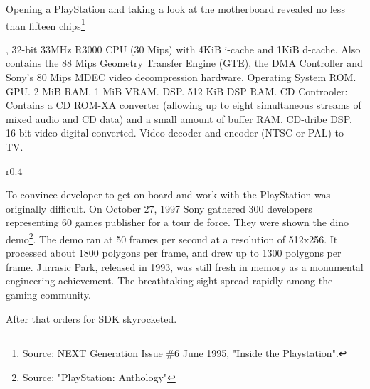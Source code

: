 \par
Opening a PlayStation and taking a look at the motherboard revealed no less than fifteen chips\footnote{Source: NEXT Generation Issue \#6 June 1995, "Inside the Playstation".}\\
\par
{}, 32-bit 33MHz R3000 CPU (30 Mips) with  4KiB i-cache and 1KiB d-cache. Also contains the 88 Mips Geometry Transfer Engine (GTE), the DMA Controller and Sony's 80 Mips MDEC video decompression hardware.
 Operating System ROM.
 GPU.
 2 MiB RAM.
 1 MiB VRAM.
 DSP.
 512 KiB DSP RAM.
 CD Controoler: Contains a CD ROM-XA converter (allowing up to eight simultaneous streams of mixed audio and CD data) and a small amount of buffer RAM.
 CD-dribe DSP.
 16-bit video digital converted.
 Video decoder and encoder (NTSC or PAL) to TV.


\par
\begin{wrapfigure}[10]{r}{0.4\textwidth}{
\centering {}}
\end{wrapfigure}
To convince developer to get on board and work with the PlayStation was originally difficult. On October 27, 1997 Sony gathered 300 developers representing 60 games publisher for a tour de force. They were shown the dino demo\footnote{Source: "PlayStation: Anthology"}. The demo ran at 50 frames per second at a resolution of 512x256. It processed about 1800 polygons per frame, and drew up to 1300 polygons per frame. Jurrasic Park, released in 1993, was still fresh in memory as a monumental engineering achievement. The breathtaking sight spread rapidly among the gaming community.\\
\par
 After that orders for SDK skyrocketed.
 
 






